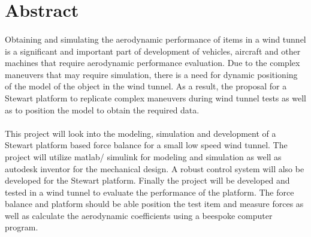 
\section*{Abstract}
\label{sec:Abstract}
\paragraph{}
Obtaining and simulating the aerodynamic performance of items in a wind tunnel is a
significant and important part of development of vehicles, aircraft and other machines
that require aerodynamic performance evaluation. Due to the complex maneuvers
that may require simulation, there is a need for dynamic positioning of the model of the object in the wind tunnel. As a result, the proposal for a Stewart platform to
replicate complex maneuvers during wind tunnel tests as well as to position the model to
obtain the required data.
\paragraph{}
This project will look into the modeling, simulation and development of a Stewart
platform based force balance for a small low speed wind tunnel. The project will utilize
matlab/ simulink for modeling and simulation as well as autodesk inventor for the mechanical
design. A robust control system will also be developed for the Stewart platform.
Finally the project will be developed and tested in a wind tunnel to evaluate the performance
of the platform. The force balance and platform should be able position the test
item and measure forces as well as calculate the aerodynamic coefficients using a beespoke computer program.




